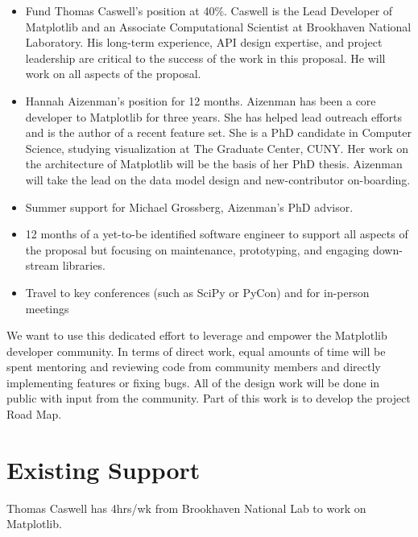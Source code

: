 \documentclass[11pt,letterpaper]{article}  %
\begin{document}
\begin{itemize}[noitemsep]

\item Fund Thomas Caswell's position at 40\%.  Caswell is the Lead Developer of Matplotlib and an Associate
  Computational Scientist at Brookhaven National Laboratory.  His
  long-term experience, API design expertise, and project leadership
  are critical to the success of the work in this proposal.  He will work
  on all aspects of the proposal.
\item Hannah Aizenman's position for 12 months.  Aizenman has
  been a core developer to Matplotlib for three years. She has helped 
  lead outreach efforts and is the author of a recent feature set.
  She is a PhD candidate in Computer Science, studying visualization at The
  Graduate Center, CUNY. Her work on the architecture of Matplotlib will be 
  the basis of her PhD thesis. Aizenman will take
  the lead on the data model design and new-contributor on-boarding.
\item Summer support for Michael Grossberg, Aizenman's PhD advisor.
\item 12 months of a yet-to-be identified software engineer to support all aspects of the proposal but focusing on maintenance, prototyping, and engaging down-stream libraries.
\item Travel to key conferences (such as SciPy or PyCon) and for in-person meetings
\end{itemize}

We want to use this dedicated effort to leverage and empower the Matplotlib developer community.  In terms of direct work, equal amounts of time will be spent mentoring and reviewing code from community members and directly implementing features or fixing bugs.  All of the design work will be done in public with
input from the community. Part of this work is to develop the project Road Map.



\section{Existing Support}
Thomas Caswell has 4hrs/wk from Brookhaven National Lab to work on Matplotlib.


\clearpage

\end{document}
